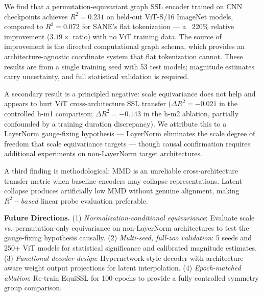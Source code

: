 
We find that a permutation-equivariant graph SSL encoder trained on CNN checkpoints achieves $R^{2}=0.231$ on held-out ViT-S/16 ImageNet models, compared to $R^{2}=0.072$ for SANE's flat tokenization --- a ~220\% relative improvement (3.$19\times$ ratio) with no ViT training data. The source of improvement is the directed computational graph schema, which provides an architecture-agnostic coordinate system that flat tokenization cannot. These results are from a single training seed with 53 test models; magnitude estimates carry uncertainty, and full statistical validation is required.

A secondary result is a principled negative: scale equivariance does not help and appears to hurt ViT cross-architecture SSL transfer ($\Delta R^{2}=-0.021$ in the controlled h-m1 comparison; $\Delta R^{2}=-0.143$ in the h-m2 ablation, partially confounded by a training duration discrepancy). We attribute this to a LayerNorm gauge-fixing hypothesis --- LayerNorm eliminates the scale degree of freedom that scale equivariance targets --- though causal confirmation requires additional experiments on non-LayerNorm target architectures.

A third finding is methodological: MMD is an unreliable cross-architecture transfer metric when baseline encoders may collapse representations. Latent collapse produces artificially low MMD without genuine alignment, making $R^{2}-based$ linear probe evaluation preferable.

\textbf{Future Directions.} (1) \textit{Normalization-conditional equivariance}: Evaluate scale vs. permutation-only equivariance on non-LayerNorm architectures to test the gauge-fixing hypothesis causally. (2) \textit{Multi-seed, full-zoo validation}: 5 seeds and 250+ ViT models for statistical significance and calibrated magnitude estimates. (3) \textit{Functional decoder design}: Hypernetwork-style decoder with architecture-aware weight output projections for latent interpolation. (4) \textit{Epoch-matched ablation}: Re-train EquiSSL for 100 epochs to provide a fully controlled symmetry group comparison.

